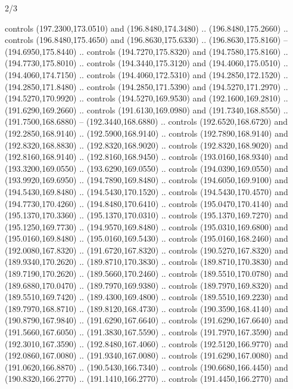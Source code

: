 \begin{flagdescription}{2/3}
\begin{scope}[xshift=0.5\flaglength,yshift=0.5\flagwidth,scale=\flagwidth/259.2]
\begin{scope}[y=0.8pt, x=0.8pt, yscale=-1,shift={(-243,-162)}]
      controls (197.2300,173.0510) and (196.8480,174.3480) .. (196.8480,175.2660) ..
      controls (196.8480,175.4650) and (196.8630,175.6330) .. (196.8630,175.8160) --
      (194.6950,175.8440) .. controls (194.7270,175.8320) and (194.7580,175.8160) ..
      (194.7730,175.8010) .. controls (194.3440,175.3120) and (194.4060,175.0510) ..
      (194.4060,174.7150) .. controls (194.4060,172.5310) and (194.2850,172.1520) ..
      (194.2850,171.8480) .. controls (194.2850,171.5390) and (194.5270,171.2970) ..
      (194.5270,170.9920) .. controls (194.5270,169.9530) and (192.1600,169.2810) ..
      (191.6290,169.2660) .. controls (191.6130,169.0980) and (191.7340,168.8550) ..
      (191.7500,168.6880) -- (192.3440,168.6880) .. controls (192.6520,168.6720) and
      (192.2850,168.9140) .. (192.5900,168.9140) .. controls (192.7890,168.9140) and
      (192.8320,168.8830) .. (192.8320,168.9020) .. controls (192.8320,168.9020) and
      (192.8160,168.9140) .. (192.8160,168.9450) .. controls (193.0160,168.9340) and
      (193.3200,169.0550) .. (193.6290,169.0550) .. controls (194.0390,169.0550) and
      (193.9920,169.6950) .. (194.7890,169.8480) .. controls (194.6050,169.9100) and
      (194.5430,169.8480) .. (194.5430,170.1520) .. controls (194.5430,170.4570) and
      (194.7730,170.4260) .. (194.8480,170.6410) .. controls (195.0470,170.4140) and
      (195.1370,170.3360) .. (195.1370,170.0310) .. controls (195.1370,169.7270) and
      (195.1250,169.7730) .. (194.9570,169.8480) .. controls (195.0310,169.6800) and
      (195.0160,169.8480) .. (195.0160,169.5430) .. controls (195.0160,168.2460) and
      (192.0080,167.8320) .. (191.6720,167.8320) .. controls (190.5270,167.8320) and
      (189.9340,170.2620) .. (189.8710,170.3830) .. controls (189.8710,170.3830) and
      (189.7190,170.2620) .. (189.5660,170.2460) .. controls (189.5510,170.0780) and
      (189.6880,170.0470) .. (189.7970,169.9380) .. controls (189.7970,169.8320) and
      (189.5510,169.7420) .. (189.4300,169.4800) .. controls (189.5510,169.2230) and
      (189.7970,168.8710) .. (189.8120,168.4730) .. controls (190.3590,168.4140) and
      (190.8790,167.9840) .. (191.6290,167.6640) .. controls (191.6290,167.6640) and
      (191.5660,167.6050) .. (191.3830,167.5590) .. controls (191.7970,167.3590) and
      (192.3010,167.3590) .. (192.8480,167.4060) .. controls (192.5120,166.9770) and
      (192.0860,167.0080) .. (191.9340,167.0080) .. controls (191.6290,167.0080) and
      (191.0620,166.8870) .. (190.5430,166.7340) .. controls (190.6680,166.4450) and
      (190.8320,166.2770) .. (191.1410,166.2770) .. controls (191.4450,166.2770) and

\end{scope}
\end{scope}
\end{flagdescription}
